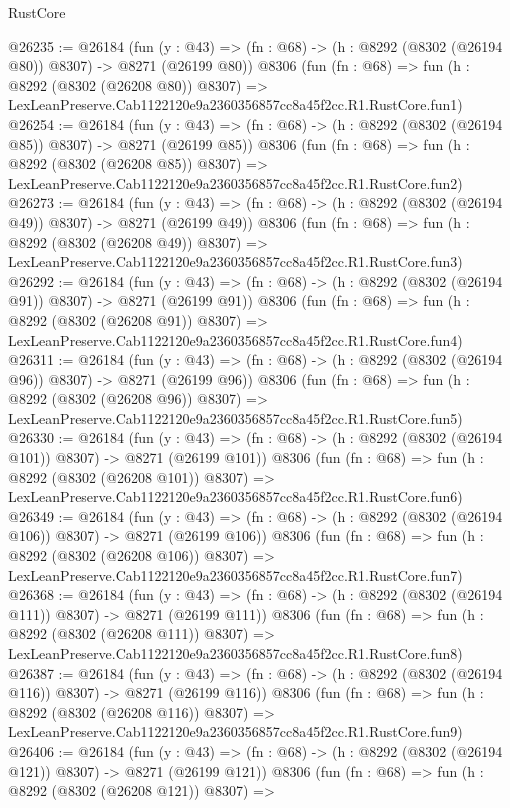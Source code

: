 \begin{lexlean}{RustCore}
\begin{coremodule}
@26235 := @26184
    (fun (y : @43) => (fn : @68) -> (h : @8292 (@8302 (@26194 @80)) @8307) -> @8271 (@26199 @80))
    @8306
    (fun (fn : @68) =>
    fun (h : @8292 (@8302 (@26208 @80)) @8307) =>
    LexLeanPreserve.Cab1122120e9a2360356857cc8a45f2cc.R1.RustCore.fun1)
@26254 := @26184
    (fun (y : @43) => (fn : @68) -> (h : @8292 (@8302 (@26194 @85)) @8307) -> @8271 (@26199 @85))
    @8306
    (fun (fn : @68) =>
    fun (h : @8292 (@8302 (@26208 @85)) @8307) =>
    LexLeanPreserve.Cab1122120e9a2360356857cc8a45f2cc.R1.RustCore.fun2)
@26273 := @26184
    (fun (y : @43) => (fn : @68) -> (h : @8292 (@8302 (@26194 @49)) @8307) -> @8271 (@26199 @49))
    @8306
    (fun (fn : @68) =>
    fun (h : @8292 (@8302 (@26208 @49)) @8307) =>
    LexLeanPreserve.Cab1122120e9a2360356857cc8a45f2cc.R1.RustCore.fun3)
@26292 := @26184
    (fun (y : @43) => (fn : @68) -> (h : @8292 (@8302 (@26194 @91)) @8307) -> @8271 (@26199 @91))
    @8306
    (fun (fn : @68) =>
    fun (h : @8292 (@8302 (@26208 @91)) @8307) =>
    LexLeanPreserve.Cab1122120e9a2360356857cc8a45f2cc.R1.RustCore.fun4)
@26311 := @26184
    (fun (y : @43) => (fn : @68) -> (h : @8292 (@8302 (@26194 @96)) @8307) -> @8271 (@26199 @96))
    @8306
    (fun (fn : @68) =>
    fun (h : @8292 (@8302 (@26208 @96)) @8307) =>
    LexLeanPreserve.Cab1122120e9a2360356857cc8a45f2cc.R1.RustCore.fun5)
@26330 := @26184
    (fun (y : @43) => (fn : @68) -> (h : @8292 (@8302 (@26194 @101)) @8307) -> @8271 (@26199 @101))
    @8306
    (fun (fn : @68) =>
    fun (h : @8292 (@8302 (@26208 @101)) @8307) =>
    LexLeanPreserve.Cab1122120e9a2360356857cc8a45f2cc.R1.RustCore.fun6)
@26349 := @26184
    (fun (y : @43) => (fn : @68) -> (h : @8292 (@8302 (@26194 @106)) @8307) -> @8271 (@26199 @106))
    @8306
    (fun (fn : @68) =>
    fun (h : @8292 (@8302 (@26208 @106)) @8307) =>
    LexLeanPreserve.Cab1122120e9a2360356857cc8a45f2cc.R1.RustCore.fun7)
@26368 := @26184
    (fun (y : @43) => (fn : @68) -> (h : @8292 (@8302 (@26194 @111)) @8307) -> @8271 (@26199 @111))
    @8306
    (fun (fn : @68) =>
    fun (h : @8292 (@8302 (@26208 @111)) @8307) =>
    LexLeanPreserve.Cab1122120e9a2360356857cc8a45f2cc.R1.RustCore.fun8)
@26387 := @26184
    (fun (y : @43) => (fn : @68) -> (h : @8292 (@8302 (@26194 @116)) @8307) -> @8271 (@26199 @116))
    @8306
    (fun (fn : @68) =>
    fun (h : @8292 (@8302 (@26208 @116)) @8307) =>
    LexLeanPreserve.Cab1122120e9a2360356857cc8a45f2cc.R1.RustCore.fun9)
@26406 := @26184
    (fun (y : @43) => (fn : @68) -> (h : @8292 (@8302 (@26194 @121)) @8307) -> @8271 (@26199 @121))
    @8306
    (fun (fn : @68) =>
    fun (h : @8292 (@8302 (@26208 @121)) @8307) =>

\end{coremodule}
\end{lexlean}
